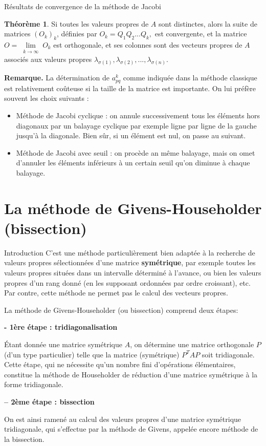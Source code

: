 \documentclass[french, 10pt]{beamer}
\theoremstyle{definition}
\newtheorem{theoreme}{Théorème}
\begin{document}
\begin{frame}{Résultats de convergence de la méthode de Jacobi }
	\begin{theoreme}
		Si toutes les valeurs propres de $A$ sont distinctes, alors la suite de matrices $(O_k)_k$, définies
		par $O_k = Q_1Q_2 ...Q_k, $ est convergente, et la matrice  $O = \lim \limits_{\substack{k \to \infty}}
		O_k$ est orthogonale, et ses
		colonnes sont des vecteurs propres de $A$ associés aux valeurs propres 
		$\lambda_{\sigma(1)}, \lambda_{\sigma(2)},...,\lambda_{\sigma(n)}
		.$
	\end{theoreme}
	\textbf{Remarque.} La détermination de $a_{p q}^k$ comme indiquée dans la méthode classique est relativement coûteuse si la taille de la matrice est importante. On lui préfère souvent les choix suivants :
	\begin{itemize}[label= ]
		\item Méthode de Jacobi cyclique : on annule successivement tous les éléments hors diagonaux par un balayage cyclique par exemple ligne par ligne de la gauche jusqu'à la diagonale. Bien sûr, si un élément est nul, on passe au suivant.
		\item Méthode de Jacobi avec seuil : on procède an même balayage, mais on omet d'annuler les éléments inférieurs à un certain seuil qu'on diminue à chaque balayage.
	\end{itemize}
\end{frame}

\section{La méthode de Givens-Householder (bissection)}
\begin{frame}{Introduction \cite{ciarlet2006introduction}}
	C’est une méthode particulièrement bien adaptée à la recherche de valeurs propres sélectionnées d’une matrice \textbf{symétrique}, par exemple toutes les valeurs propres situées dans un intervalle déterminé à l’avance, ou bien les valeurs propres d’un rang donné (en les supposant ordonnées par ordre croissant), etc. Par contre, cette méthode ne permet pas le calcul des vecteurs propres.
	
	La méthode de Givens-Householder (ou bissection) comprend deux étapes:
	
	\textbf{- 1ère étape : tridiagonalisation}
	
	Étant donnée une matrice symétrique \( A \), on détermine une matrice orthogonale \( P \) (d’un type particulier) telle que la matrice (symétrique) \( P^T A P \) soit tridiagonale. Cette étape, qui ne nécessite qu’un nombre fini d’opérations élémentaires, constitue la méthode de Householder de réduction d’une matrice symétrique à la forme tridiagonale.
	
	\textbf{– 2ème étape : bissection}
	
	On est ainsi ramené au calcul des valeurs propres d’une matrice symétrique tridiagonale, qui s’effectue par la méthode de Givens, appelée encore méthode de la bissection. 
\end{frame}
\end{document}
